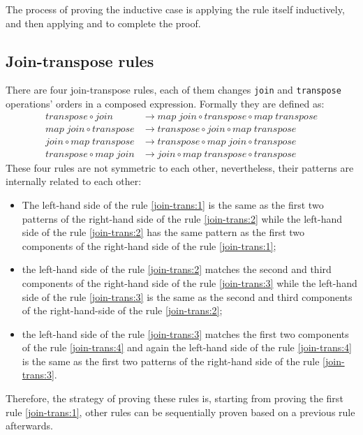 \documentclass{l4proj}
\begin{document}
The process of proving the inductive case is applying the rule itself inductively, and then applying  and  to complete the proof.

\subsection{Join-transpose rules}
\label{move:join}
There are four join-transpose rules, each of them changes \texttt{join} and \texttt{transpose} operations' orders in a composed expression. Formally they are defined as:
\begin{align}
    \label{join-trans:1}
    transpose \circ join &\to map\; join \circ transpose \circ map\; transpose \\
    \label{join-trans:2}
    map\; join \circ transpose &\to transpose \circ join \circ map\; transpose \\
    \label{join-trans:3}
    join \circ map\; transpose &\to transpose \circ map\; join \circ transpose \\
    \label{join-trans:4}
    transpose \circ map\; join &\to join \circ map\; transpose \circ transpose
\end{align}
These four rules are not symmetric to each other, nevertheless, their patterns are internally related to each other:
\begin{itemize}
    \item The left-hand side of the rule \ref{join-trans:1} is the same as the first two patterns of the right-hand side of the rule \ref{join-trans:2} while the left-hand side of the rule \ref{join-trans:2} has the same pattern as the first two components of the right-hand side of the rule \ref{join-trans:1};
    \item the left-hand side of the rule \ref{join-trans:2} matches the second and third components of the right-hand side of the rule \ref{join-trans:3} while the left-hand side of the rule \ref{join-trans:3} is the same as the second and third components of the right-hand-side of the rule \ref{join-trans:2};
    \item the left-hand side of the rule \ref{join-trans:3} matches the first two components of the rule \ref{join-trans:4} and again the left-hand side of the rule \ref{join-trans:4} is the same as the first two patterns of the right-hand side of the rule \ref{join-trans:3}.
\end{itemize}
Therefore, the strategy of proving these rules is, starting from proving the first rule \ref{join-trans:1}, other rules can be sequentially proven based on a previous rule afterwards.
\end{document}
